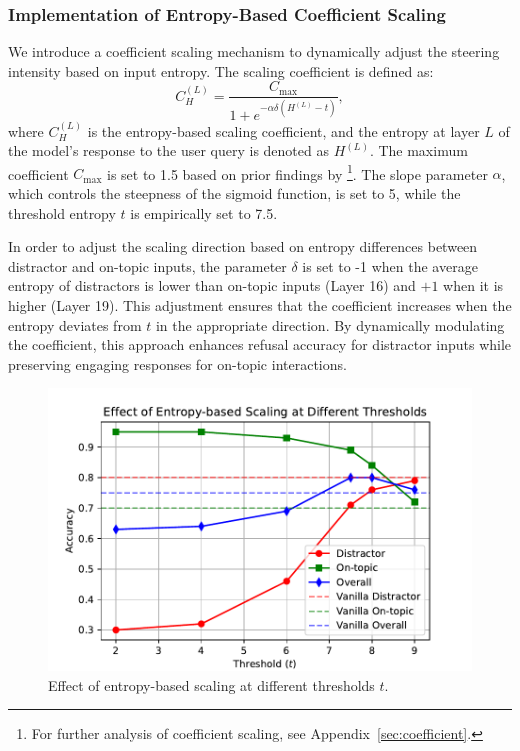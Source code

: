 \documentclass[11pt]{article}
\begin{document}
\subsubsection{Implementation of Entropy-Based Coefficient Scaling}\label{sec:scaling}
We introduce a coefficient scaling mechanism to dynamically adjust the steering intensity based on input entropy. The scaling coefficient is defined as:
\[
C_H^{(L)} = \frac{C_{\text{max}}}{1 + e^{-\alpha \delta (H^{(L)} - t)}},
\]
where \( C_H^{(L)} \) is the entropy-based scaling coefficient, and the entropy at layer \(L\) of the model's response to the user query is denoted as \( H^{(L)} \). The maximum coefficient \( C_{\text{max}} \) is set to 1.5 based on prior findings by \citet{rimsky-etal-2024-steering}\footnote{For further analysis of coefficient scaling, see Appendix~\ref{sec:coefficient}.}. The slope parameter \( \alpha \), which controls the steepness of the sigmoid function, is set to 5, while the threshold entropy \( t \) is empirically set to 7.5.

In order to adjust the scaling direction based on entropy differences between distractor and on-topic inputs, the parameter \(\delta\) is set to -1 when the average entropy of distractors is lower than on-topic inputs (Layer 16) and \(+1\) when it is higher (Layer 19). This adjustment ensures that the coefficient increases when the entropy deviates from \( t \) in the appropriate direction. By dynamically modulating the coefficient, this approach enhances refusal accuracy for distractor inputs while preserving engaging responses for on-topic interactions.


\begin{figure}[t]
    \centering
    \includegraphics[width=\columnwidth]{latex/figures/entropy_scaling_plot.pdf}
    \caption{Effect of entropy-based scaling at different thresholds $t$.}
    \label{fig:threshold}
\end{figure}
\end{document}

